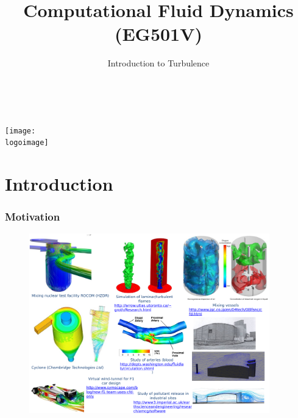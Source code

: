 \documentclass[10pt,compress]{beamer}
\institute{School of Engineering}
\title{Computational Fluid Dynamics (EG501V)}
\subtitle{Introduction to Turbulence}
\date[]{}
\author[\shortname]{%
  \fullname\\\ttfamily{\emailaddress}
}
\newcommand{\logoimage}{./FigBanner/UoAHorizBanner}
\begin{document}
\begin{frame}
  \titlepage
  \vfill%
  \begin{center}
    \texttt{[image: \\logoimage]}
  \end{center}
\end{frame}





\section{Introduction}

\begin{frame}
 \frametitle{Motivation}

   \begin{figure}%
    \begin{center}
     \includegraphics[width=12.cm, height=7.8cm, clip]{./Figs/SpecificIndustrialEnvironmentalApplication2}
    \end{center}
   \end{figure}    

\end{frame}
 
\end{document}
